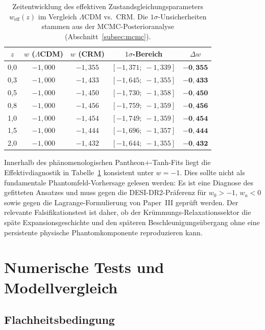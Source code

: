 \documentclass[aps,prd,twocolumn,superscriptaddress,nofootinbib]{revtex4-2}
\begin{document}
\begin{table}[H]
\centering
\caption{Zeitentwicklung des effektiven Zustandsgleichungsparameters $w_{\mathrm{eff}}(z)$ im Vergleich $\Lambda$CDM vs.\ CRM. Die $1\sigma$-Unsicherheiten stammen aus der MCMC-Posterioranalyse (Abschnitt~\ref{subsec:mcmc}).}
\label{tab:weff}
\begin{tabular}{ccccc}
\toprule
$z$ & $w$ ($\Lambda$CDM) & $w$ (CRM) & $1\sigma$-Bereich & $\Delta w$ \\
\midrule
0,0 & $-1{,}000$ & $-1{,}355$ & $[-1{,}371;\;-1{,}339]$ & $\mathbf{-0{,}355}$ \\
0,3 & $-1{,}000$ & $-1{,}433$ & $[-1{,}645;\;-1{,}355]$ & $\mathbf{-0{,}433}$ \\
0,5 & $-1{,}000$ & $-1{,}450$ & $[-1{,}730;\;-1{,}358]$ & $\mathbf{-0{,}450}$ \\
0,8 & $-1{,}000$ & $-1{,}456$ & $[-1{,}759;\;-1{,}359]$ & $\mathbf{-0{,}456}$ \\
1,0 & $-1{,}000$ & $-1{,}454$ & $[-1{,}749;\;-1{,}359]$ & $\mathbf{-0{,}454}$ \\
1,5 & $-1{,}000$ & $-1{,}444$ & $[-1{,}696;\;-1{,}357]$ & $\mathbf{-0{,}444}$ \\
2,0 & $-1{,}000$ & $-1{,}432$ & $[-1{,}644;\;-1{,}355]$ & $\mathbf{-0{,}432}$ \\
\bottomrule
\end{tabular}
\end{table}

Innerhalb des phänomenologischen Pantheon+-Tanh-Fits liegt die Effektivdiagnostik in Tabelle~\ref{tab:weff} konsistent unter $w=-1$. Dies sollte nicht als fundamentale Phantomfeld-Vorhersage gelesen werden: Es ist eine Diagnose des gefitteten Ansatzes und muss gegen die DESI-DR2-Präferenz für $w_0>-1$, $w_a<0$ sowie gegen die Lagrange-Formulierung von Paper~III geprüft werden. Der relevante Falsifikationstest ist daher, ob der Krümmungs-Relaxationssektor die späte Expansionsgeschichte und den späteren Beschleunigungsübergang ohne eine persistente physische Phantomkomponente reproduzieren kann.

\section{Numerische Tests und Modellvergleich}
\label{sec:numerik}

\subsection{Flachheitsbedingung}
\label{subsec:flachheit}
\end{document}
